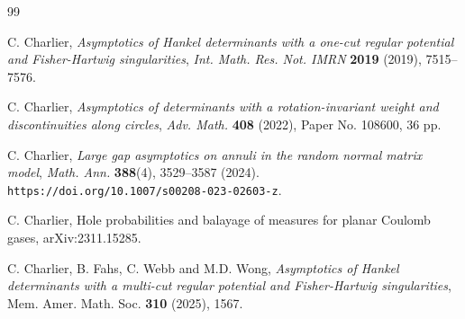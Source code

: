 \documentclass[reqno]{amsart}
\newcommand{\1}{\mathds{1}}
\numberwithin{equation}{section}
\theoremstyle{definition}
\begin{document}
\begin{thebibliography}{99}

 C. Charlier, \emph{Asymptotics of Hankel determinants with a one-cut regular potential and Fisher-Hartwig singularities}, \textit{Int. Math. Res. Not. IMRN} \textbf{2019} (2019), 7515--7576.






 C. Charlier, \emph{Asymptotics of determinants with a rotation-invariant weight and discontinuities along circles}, \textit{Adv. Math.} \textbf{408} (2022), Paper No. 108600, 36 pp.

 C. Charlier, \emph{Large gap asymptotics on annuli in the random normal matrix model}, \textit{Math. Ann.} \textbf{388}(4), 3529--3587 (2024). \texttt{https://doi.org/10.1007/s00208-023-02603-z}.

C. Charlier, Hole probabilities and balayage of measures for planar Coulomb gases, arXiv:2311.15285.


 C. Charlier, B. Fahs, C. Webb and M.D. Wong, \emph{Asymptotics of Hankel determinants with a multi-cut regular potential and Fisher-Hartwig singularities}, Mem. Amer. Math. Soc. \textbf{310} (2025), 1567.





\end{thebibliography}
\end{document}
